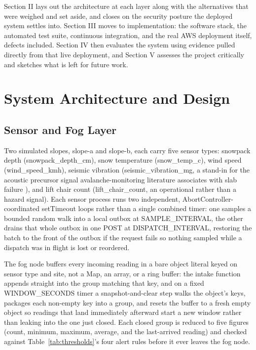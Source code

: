 \documentclass[conference]{IEEEtran}
\begin{document}
Section II lays out the architecture at each layer along with the alternatives that were weighed and set aside, and closes on the security posture the deployed system settles into. Section III moves to implementation: the software stack, the automated test suite, continuous integration, and the real AWS deployment itself, defects included. Section IV then evaluates the system using evidence pulled directly from that live deployment, and Section V assesses the project critically and sketches what is left for future work.

\section{System Architecture and Design}
\subsection{Sensor and Fog Layer}
Two simulated slopes, slope-a and slope-b, each carry five sensor types: snowpack depth (snowpack\_depth\_cm), snow temperature (snow\_temp\_c), wind speed (wind\_speed\_kmh), seismic vibration (seismic\_vibration\_mg, a stand-in for the acoustic precursor signal avalanche-monitoring literature associates with slab failure \cite{ref3}), and lift chair count (lift\_chair\_count, an operational rather than a hazard signal). Each sensor process runs two independent, AbortController-coordinated setTimeout loops rather than a single combined timer: one samples a bounded random walk into a local outbox at SAMPLE\_INTERVAL, the other drains that whole outbox in one POST at DISPATCH\_INTERVAL, restoring the batch to the front of the outbox if the request fails so nothing sampled while a dispatch was in flight is lost or reordered.

The fog node buffers every incoming reading in a bare object literal keyed on sensor type and site, not a Map, an array, or a ring buffer: the intake function appends straight into the group matching that key, and on a fixed WINDOW\_SECONDS timer a snapshot-and-clear step walks the object's keys, packages each non-empty key into a group, and resets the buffer to a fresh empty object so readings that land immediately afterward start a new window rather than leaking into the one just closed. Each closed group is reduced to five figures (count, minimum, maximum, average, and the last-arrived reading) and checked against Table~\ref{tab:thresholds}'s four alert rules before it ever leaves the fog node.
\end{document}
